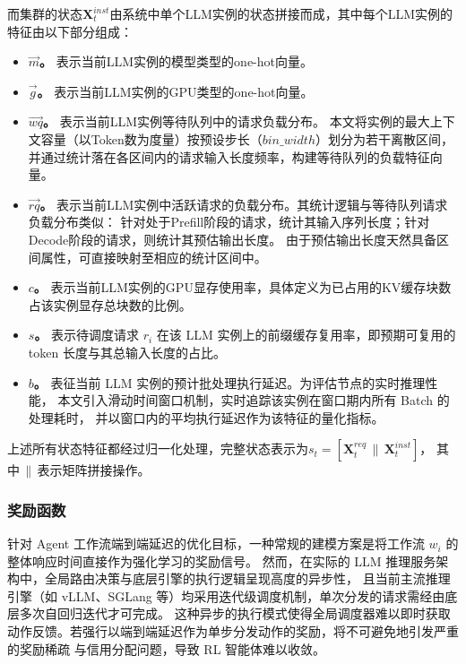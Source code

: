 而集群的状态$\mathbf{X}_t^{inst}$由系统中单个LLM实例的状态拼接而成，其中每个LLM实例的特征由以下部分组成：
\begin{itemize}
  \item \textbf{$\vec{m}$。}
        表示当前LLM实例的模型类型的one-hot向量。
  \item \textbf{$\vec{g}$。}
        表示当前LLM实例的GPU类型的one-hot向量。
  \item \textbf{$\vec{wq}$。}
        表示当前LLM实例等待队列中的请求负载分布。
        本文将实例的最大上下文容量（以Token数为度量）按预设步长（$bin\_width$）划分为若干离散区间，
        并通过统计落在各区间内的请求输入长度频率，构建等待队列的负载特征向量。
  \item \textbf{$\vec{rq}$。}
        表示当前LLM实例中活跃请求的负载分布。其统计逻辑与等待队列请求负载分布类似：
        针对处于Prefill阶段的请求，统计其输入序列长度；针对Decode阶段的请求，则统计其预估输出长度。
        由于预估输出长度天然具备区间属性，可直接映射至相应的统计区间中。
  \item \textbf{$c$。}
        表示当前LLM实例的GPU显存使用率，具体定义为已占用的KV缓存块数占该实例显存总块数的比例。
  \item \textbf{$s$。}
        表示待调度请求 $r_i$ 在该 LLM 实例上的前缀缓存复用率，即预期可复用的 token 长度与其总输入长度的占比。
  \item \textbf{$b$。}
        表征当前 LLM 实例的预计批处理执行延迟。为评估节点的实时推理性能，
        本文引入滑动时间窗口机制，实时追踪该实例在窗口期内所有 Batch 的处理耗时，
        并以窗口内的平均执行延迟作为该特征的量化指标。
\end{itemize}

上述所有状态特征都经过归一化处理，完整状态表示为$s_t = \left[\mathbf{X}_t^{req} \,\|\, \mathbf{X}_t^{inst}\right]$，
其中$\,\|\,$表示矩阵拼接操作。

\subsubsection{奖励函数}

针对 Agent 工作流端到端延迟的优化目标，一种常规的建模方案是将工作流 $w_i$ 的整体响应时间直接作为强化学习的奖励信号。
然而，在实际的 LLM 推理服务架构中，全局路由决策与底层引擎的执行逻辑呈现高度的异步性，
且当前主流推理引擎（如 vLLM、SGLang 等）均采用迭代级调度机制，单次分发的请求需经由底层多次自回归迭代才可完成。
这种异步的执行模式使得全局调度器难以即时获取动作反馈。若强行以端到端延迟作为单步分发动作的奖励，将不可避免地引发严重的奖励稀疏
与信用分配问题，导致 RL 智能体难以收敛。

